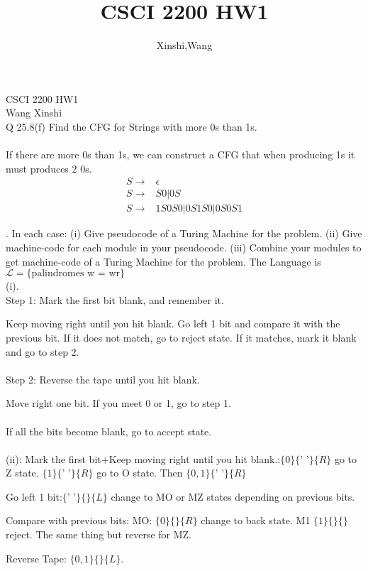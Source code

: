 \documentclass{article}
\title{CSCI 2200 HW1}
\author{Xinshi,Wang}
\begin{document}
\noindent
CSCI 2200 HW1\\
Wang Xinshi\\

\noindent Q 25.8(f) Find the CFG for Strings with more 0s than 1s.
\\\\
If there are more 0s than 1s, we can construct a CFG that when producing 1s it must produces 2 0s.\\
\begin{align}
	S \rightarrow &\epsilon \\
	S \rightarrow &S0|0S\\
	S \rightarrow &1S0S0|0S1S0|0S0S1
\end{align}

\clearpage

\noindent {}. In each case: (i) Give pseudocode of a Turing Machine for the problem. (ii) Give machine-code for
each module in your pseudocode. (iii) Combine your modules to get machine-code of a Turing Machine for the problem. The Language is $\mathcal{L} = \{\text{palindromes w = wr}\}$\\

\noindent (i).\\
Step 1: Mark the first bit blank, and remember it.

Keep moving right until you hit blank. Go left 1 bit and compare it with the previous bit. If it does not match, go to reject state. If it matches, mark it blank and go to step 2.\\\\
Step 2: Reverse the tape until you hit blank.

Move right one bit. If you meet 0 or 1, go to step 1.\\\\
If all the bits become blank, go to accept state.\\\\
(ii): Mark the first bit+Keep moving right until you hit blank.:$\{0\}\{\text{' '}\}\{R\}$ go to Z state. $\{1\}\{\text{' '}\}\{R\}$ go to O state. Then $\{0,1\}\{\text{' '}\}\{R\}$

Go left 1 bit:$\{\text{' '}\}\{\}\{L\}$ change to MO or MZ states depending on previous bits.

Compare with previous bits: MO: $\{0\}\{\}\{R\}$ change to back state. M1 $\{1\}\{\}\{\}$ reject. The same thing but reverse for MZ.

Reverse Tape: $\{0,1\}\{\}\{L\}$.
\end{document}
